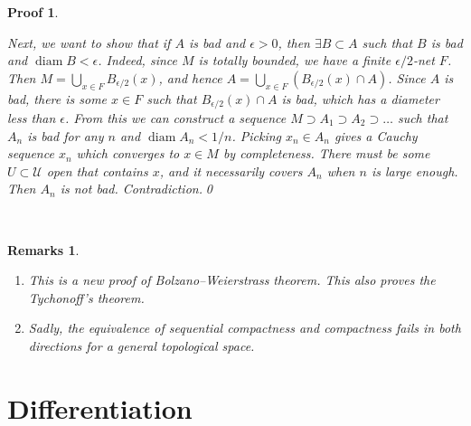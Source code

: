 \documentclass{article}
\theoremstyle{plain}\theoremheaderfont{\normalfont\itshape}\theorembodyfont{\rmfamily}\theoremseparator{.}\newtheorem*{rem}{Remark}\newtheorem*{ex}{Example}\newtheorem*{proof}{Proof}\newtheorem*{altp}{Alternative proof}
\theoremstyle{plain}\theoremheaderfont{\normalfont\bfseries}\theorembodyfont{\rmfamily}\theoremseparator{.}\newtheorem{thm}{Theorem}[section]\newtheorem{lem}[thm]{Lemma}\newtheorem{prop}[thm]{Proposition}\newtheorem*{cor}{Corollary}\newtheorem{defn}[thm]{Definition}\newtheorem{clm}[thm]{Claim}\newtheorem{clminproof}{Claim}
\theoremstyle{break}\theoremheaderfont{\normalfont\itshape}\theorembodyfont{\rmfamily}\theoremseparator{.\medskip}\newtheorem*{proofskip}{Proof}\newtheorem*{exs}{Examples}\newtheorem*{rems}{Remarks}
\theoremstyle{break}\theoremheaderfont{\normalfont\bfseries}\theorembodyfont{\rmfamily}\theoremseparator{.\medskip}\newtheorem{lemskip}[thm]{Lemma}\newtheorem{defnskip}[thm]{Definition}\newtheorem{propskip}[thm]{Proposition}\newtheorem{thmskip}[thm]{Theorem}
\newcommand{\qed}{\hfill\ensuremath{\Box}}
\DeclareMathOperator{\diam}{diam}
\begin{document}
\begin{proofskip}
\begin{itemize}[topsep=0pt]
            Next, we want to show that if \(A\) is bad and \(\epsilon>0\), then \(\exists B\subset A\) such that \(B\) is bad and \(\diam B<\epsilon\). Indeed, since \(M\) is totally bounded, we have a finite \(\epsilon/2\)-net \(F\). Then \(M=\bigcup_{x\in F}B_{\epsilon/2}(x)\), and hence \(A=\bigcup_{x\in F}(B_{\epsilon/2}(x)\cap A)\). Since \(A\) is bad, there is some \(x\in F\) such that \(B_{\epsilon/2}(x)\cap A\) is bad, which has a diameter less than \(\epsilon\). From this we can construct a sequence \(M\supset A_1\supset A_2\supset\dots\) such that \(A_n\) is bad for any \(n\) and \(\diam A_n<1/n\). Picking \(x_n\in A_n\) gives a Cauchy sequence \(x_n\) which converges to \(x\in M\) by completeness. There must be some \(U\subset\mathscr{U}\) open that contains \(x\), and it necessarily covers \(A_n\) when \(n\) is large enough. Then \(A_n\) is not bad. Contradiction.\qed
        \end{itemize}
    \end{proofskip}\
    \begin{rems}
        \begin{enumerate}[label=(\roman*),topsep=0pt]
            \item This is a new proof of Bolzano--Weierstrass theorem. This also proves the Tychonoff's theorem.
            \item Sadly, the equivalence of sequential compactness and compactness fails in both directions for a general topological space.
        \end{enumerate}
    \end{rems}

    \newpage
    \section{Differentiation}
\end{document}
